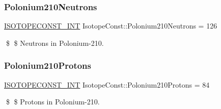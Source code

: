 \subsubsection{\texorpdfstring{Polonium210\+Neutrons}{Polonium210Neutrons}}
{\footnotesize\ttfamily \mbox{\hyperlink{group___isotope_const-_macros_ga5f18360b3e99483a35c32d789e62621c}{I\+S\+O\+T\+O\+P\+E\+C\+O\+N\+S\+T\+\_\+\+I\+NT}} Isotope\+Const\+::\+Polonium210\+Neutrons = 126}

\$ \$ Neutrons in Polonium-\/210. \mbox{\label{group___isotope_const-_polonium-_po210_ga37bcd7901913e8db864b8817610ce8b0}} 
\subsubsection{\texorpdfstring{Polonium210\+Protons}{Polonium210Protons}}
{\footnotesize\ttfamily \mbox{\hyperlink{group___isotope_const-_macros_ga5f18360b3e99483a35c32d789e62621c}{I\+S\+O\+T\+O\+P\+E\+C\+O\+N\+S\+T\+\_\+\+I\+NT}} Isotope\+Const\+::\+Polonium210\+Protons = 84}

\$ \$ Protons in Polonium-\/210. 